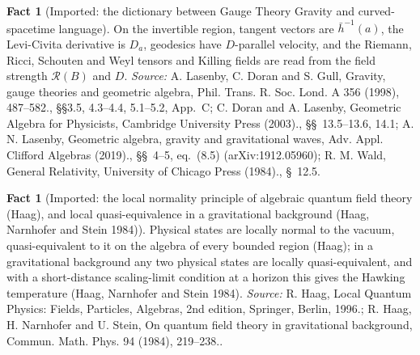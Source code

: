 \documentclass[11pt]{article}
\theoremstyle{definition}
\newtheorem{fact}[theorem]{Fact}
\theoremstyle{plain}
\providecommand{\hb}{}\renewcommand{\hb}{\bar{h}}
\begin{document}
\begin{fact}[Imported: the dictionary between Gauge Theory Gravity and curved-spacetime language]\label{c:synthesis.imported-gtg-dictionary}
On the invertible region, tangent vectors are $\hb^{-1}(a)$, the Levi-Civita derivative is $D_a$, geodesics have $D$-parallel velocity, and the Riemann, Ricci, Schouten and Weyl tensors and Killing fields are read from the field strength $\mathcal{R}(B)$ and $D$.
\emph{Source:} A. Lasenby, C. Doran and S. Gull, Gravity, gauge theories and geometric algebra, Phil. Trans. R. Soc. Lond. A 356 (1998), 487--582., \S\S 3.5, 4.3--4.4, 5.1--5.2, App.~C; C. Doran and A. Lasenby, Geometric Algebra for Physicists, Cambridge University Press (2003)., \S\S~13.5--13.6, 14.1; A. N. Lasenby, Geometric algebra, gravity and gravitational waves, Adv. Appl. Clifford Algebras (2019)., \S\S~4--5, eq.~(8.5) (arXiv:1912.05960); R. M. Wald, General Relativity, University of Chicago Press (1984)., \S~12.5.
\end{fact}

\begin{fact}[Imported: the local normality principle of algebraic quantum field theory (Haag), and local quasi-equivalence in a gravitational background (Haag, Narnhofer and Stein 1984)]\label{c:synthesis.imported-haag-local-normality}
Physical states are locally normal to the vacuum, quasi-equivalent to it on the algebra of every bounded region (Haag); in a gravitational background any two physical states are locally quasi-equivalent, and with a short-distance scaling-limit condition at a horizon this gives the Hawking temperature (Haag, Narnhofer and Stein 1984).
\emph{Source:} R. Haag, Local Quantum Physics: Fields, Particles, Algebras, 2nd edition, Springer, Berlin, 1996.; R. Haag, H. Narnhofer and U. Stein, On quantum field theory in gravitational background, Commun. Math. Phys. 94 (1984), 219--238..
\end{fact}
\end{document}
